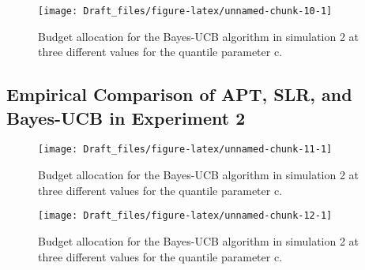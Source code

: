 \documentclass[11pt,]{article}
\begin{document}
\begin{figure}

{\centering \texttt{[image: Draft\_files/figure-latex/unnamed-chunk-10-1]} 

}

\caption{Budget allocation for the Bayes-UCB algorithm in simulation 2 at three different values for the quantile parameter c.}\label{fig:unnamed-chunk-10}
\end{figure}

\subsection{Empirical Comparison of APT, SLR, and Bayes-UCB in
Experiment
2}\label{empirical-comparison-of-apt-slr-and-bayes-ucb-in-experiment-2}

\begin{figure}

{\centering \texttt{[image: Draft\_files/figure-latex/unnamed-chunk-11-1]} 

}

\caption{Budget allocation for the Bayes-UCB algorithm in simulation 2 at three different values for the quantile parameter c.}\label{fig:unnamed-chunk-11}
\end{figure}

\begin{figure}

{\centering \texttt{[image: Draft\_files/figure-latex/unnamed-chunk-12-1]} 

}

\caption{Budget allocation for the Bayes-UCB algorithm in simulation 2 at three different values for the quantile parameter c.}\label{fig:unnamed-chunk-12}
\end{figure}
\end{document}
